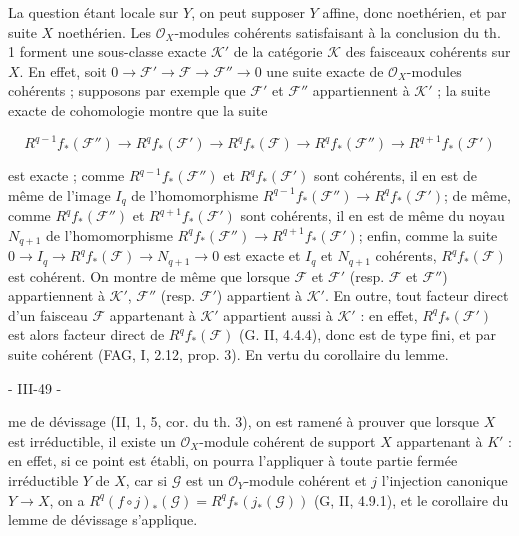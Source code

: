 La question étant locale sur $Y$, on peut supposer $Y$ affine, donc noethérien, et par suite $X$ noethérien. Les $\mathcal{O}_X$-modules cohérents satisfaisant à la conclusion du th. 1 forment une sous-classe exacte $\mathcal{K}'$ de la catégorie $\mathcal{K}$ des faisceaux cohérents sur $X$. En effet, soit $0 \to \mathcal{F}' \to \mathcal{F} \to \mathcal{F}'' \to 0$ une suite exacte de $\mathcal{O}_X$-modules cohérents ; supposons par exemple que $\mathcal{F}'$ et $\mathcal{F}''$ appartiennent à $\mathcal{K}'$ ; la suite exacte de cohomologie montre que la suite

$$R^{q-1} f_*(\mathcal{F}'') \to R^q f_*(\mathcal{F}') \to R^q f_*(\mathcal{F}) \to R^q f_*(\mathcal{F}'') \to R^{q+1} f_*(\mathcal{F}')$$

est exacte ; comme $R^{q-1} f_*(\mathcal{F}'')$ et $R^q f_*(\mathcal{F}')$ sont cohérents, il en est de même de l'image $I_q$ de l'homomorphisme $R^{q-1} f_*(\mathcal{F}'') \to R^q f_*(\mathcal{F}')$; de même, comme $R^q f_*(\mathcal{F}'')$ et $R^{q+1} f_*(\mathcal{F}')$ sont cohérents, il en est de même du noyau $N_{q+1}$ de l'homomorphisme $R^q f_*(\mathcal{F}'') \to R^{q+1} f_*(\mathcal{F}')$; enfin, comme la suite $0 \to I_q \to R^q f_*(\mathcal{F}) \to N_{q+1} \to 0$ est exacte et $I_q$ et $N_{q+1}$ cohérents, $R^q f_*(\mathcal{F})$ est cohérent. On montre de même que lorsque $\mathcal{F}$ et $\mathcal{F}'$ (resp. $\mathcal{F}$ et $\mathcal{F}''$) appartiennent à $\mathcal{K}'$, $\mathcal{F}''$ (resp. $\mathcal{F}'$) appartient à $\mathcal{K}'$. En outre, tout facteur direct d'un faisceau $\mathcal{F}$ appartenant à $\mathcal{K}'$ appartient aussi à $\mathcal{K}'$ : en effet, $R^q f_*(\mathcal{F}')$ est alors facteur direct de $R^q f_*(\mathcal{F})$ (G. II, 4.4.4), donc est de type fini, et par suite cohérent (FAG, I, 2.12, prop. 3). En vertu du corollaire du lemme.

\newpage


- III-49 -

me de dévissage (II, 1, 5, cor. du th. 3), on est ramené à prouver que lorsque $X$ est irréductible, il existe un $\mathcal{O}_X$-module cohérent de support $X$ appartenant à $K'$ : en effet, si ce point est établi, on pourra l'appliquer à toute partie fermée irréductible $Y$ de $X$, car si $\mathcal{G}$ est un $\mathcal{O}_Y$-module cohérent et $j$ l'injection canonique $Y \to X$, on a $R^q(f \circ j)_*(\mathcal{G}) = R^q f_* (j_* (\mathcal{G}))$ (G, II, 4.9.1), et le corollaire du lemme de dévissage s'applique.

